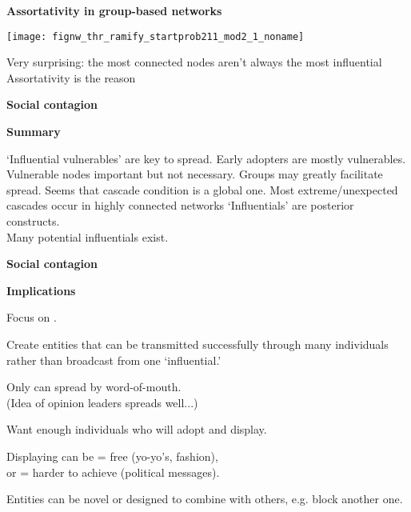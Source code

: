   \textbf{Assortativity in group-based networks}

  \centering

  \texttt{[image: fignw\_thr\_ramify\_startprob211\_mod2\_1\_noname]}

  
   Very surprising: the most connected nodes aren't always the most influential
   \alert{Assortativity} is the reason
  
  

  \textbf{Social contagion}

  \textbf{Summary}
    

     \alert{`Influential vulnerables'} are key to spread.
     Early adopters are mostly vulnerables.
     Vulnerable nodes important but not necessary.
     Groups may greatly facilitate spread.
     Seems that cascade condition is a global one.
     Most extreme/unexpected cascades occur in highly connected networks 
     `Influentials' are posterior constructs.\\
     Many potential influentials exist.
    
  
  

  \textbf{Social contagion}

  \textbf{Implications}
  
  
    Focus on .
  
    Create entities that can be transmitted successfully
    through many individuals rather than broadcast from one `influential.'
  
    Only  can spread by word-of-mouth.\\
    \qquad (Idea of opinion leaders spreads well...)
  
    Want enough individuals who will adopt and display.
  
    Displaying can be  = free (yo-yo's, fashion),\\
    or  = harder to achieve (political messages).
  
    Entities can be novel or designed to combine with others,
    e.g. block another one.
  
  




